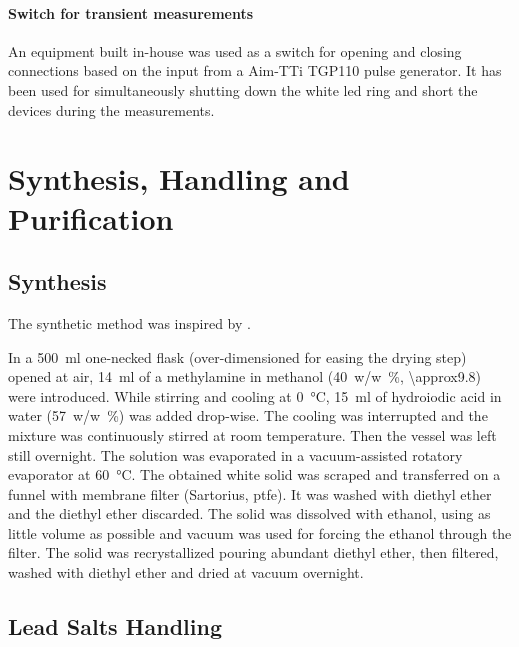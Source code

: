 		\paragraph{Switch for transient measurements} An equipment built in-house was used as a switch for opening and closing connections based on the input from a Aim-TTi TGP110 pulse generator.
		It has been used for simultaneously shutting down the white \gls{led} ring and short the devices during the  measurements.


\section{Synthesis, Handling and Purification}

	\subsection{ Synthesis}\label{methods-MAI}


		The synthetic method was inspired by \cite{Im2011a}.

		In a \SI{500}{\ml} one-necked flask (over-dimensioned for easing the drying step) opened at air, \SI{14}{\ml} of a methylamine in methanol (\SI{40}{w/w\%}, \SI{\approx9.8}{\Molar}) were introduced. While stirring and cooling at \SI{0}{\celsius}, \SI{15}{\ml} of hydroiodic acid in water (\SI{57}{w/w\%}) was added drop-wise. The cooling was interrupted and the mixture was continuously stirred at room temperature. Then the vessel was left still overnight.
		The solution was evaporated in a vacuum-assisted rotatory evaporator at \SI{60}{\celsius}.
		The obtained white solid was scraped and transferred on a funnel with membrane filter (Sartorius, \acrshort{ptfe}). It was washed with diethyl ether and the diethyl ether discarded. The solid was dissolved with ethanol, using as little volume as possible and vacuum was used for forcing the ethanol through the filter. The solid was recrystallized pouring abundant diethyl ether, then filtered, washed with diethyl ether and dried at vacuum overnight.

	\subsection{Lead Salts Handling}

